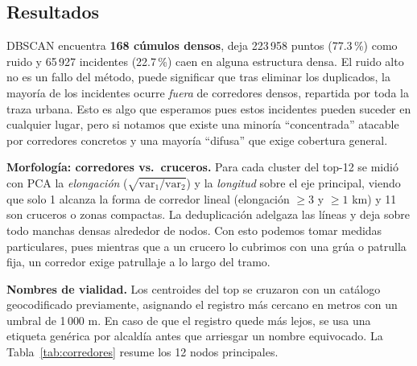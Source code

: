 \documentclass[11pt,letterpaper]{article}
\begin{document}
\subsection{Resultados}

DBSCAN encuentra \textbf{168 cúmulos densos}, deja 223\,958 puntos
(77.3\,\%) como ruido y 65\,927 incidentes (22.7\,\%) caen en alguna
estructura densa. El ruido alto no es un fallo del método, puede significar que tras eliminar los
duplicados, la mayoría de los incidentes ocurre \emph{fuera} de corredores
densos, repartida por toda la traza urbana. Esto es algo que esperamos pues estos incidentes
pueden suceder en cualquier lugar, pero si notamos que  existe una minoría ``concentrada''
atacable por corredores concretos y una mayoría ``difusa'' que exige cobertura general.

\textbf{Morfología: corredores vs.\ cruceros.} Para cada cluster del top-12 se
midió con PCA la \emph{elongación} ($\sqrt{\text{var}_1/\text{var}_2}$) y la
\emph{longitud} sobre el eje principal, viendo que solo 1 alcanza la forma de corredor
lineal (elongación $\geq 3$ y $\geq 1$ km) y 11 son cruceros o zonas
compactas. La deduplicación adelgaza las líneas y deja sobre todo manchas
densas alrededor de nodos. Con esto podemos tomar medidas particulares, pues mientras que a un
crucero lo cubrimos con una grúa o patrulla fija, un corredor exige patrullaje a
lo largo del tramo.

\textbf{Nombres de vialidad.} Los centroides del top se cruzaron con un
catálogo geocodificado previamente, asignando el registro más cercano en metros con un umbral de
1\,000 m. En caso de que el registro quede más lejos, se usa una etiqueta genérica por
alcaldía antes que arriesgar un nombre equivocado. La Tabla~\ref{tab:corredores} 
resume los 12 nodos principales.
\end{document}
